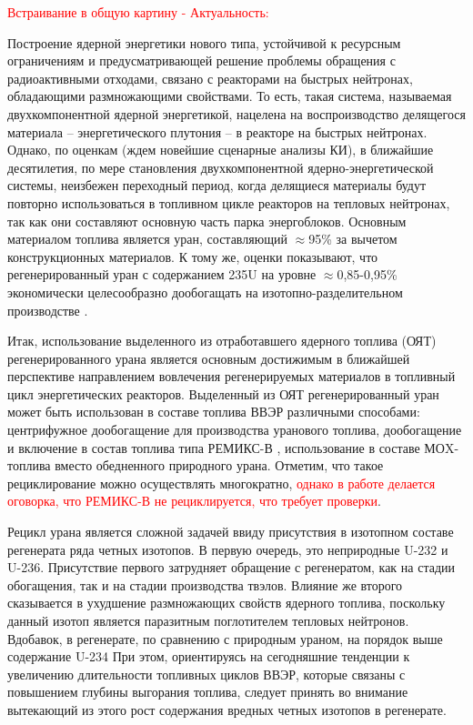 
{\actuality}

\textcolor{red}{Встраивание в общую картину - Актуальность:}

Построение ядерной энергетики нового типа, устойчивой к ресурсным ограничениям и предусматривающей решение проблемы обращения с радиоактивными отходами, связано с реакторами на быстрых нейтронах, обладающими размножающими свойствами. То есть, такая система, называемая двухкомпонентной ядерной энергетикой, нацелена на воспроизводство делящегося материала -- энергетического  плутония -- в реакторе на быстрых нейтронах. Однако, по оценкам (ждем новейшие сценарные анализы КИ), в ближайшие десятилетия, по мере становления двухкомпонентной ядерно-энергетической системы, неизбежен переходный период, когда делящиеся материалы будут повторно использоваться в топливном цикле реакторов на тепловых нейтронах, так как они составляют основную часть парка энергоблоков. Основным материалом топлива является уран, составляющий $\approx$95\% за вычетом конструкционных материалов. К тому же, оценки показывают, что регенерированный уран с содержанием 235U на уровне $\approx$0,85-0,95\% экономически целесообразно дообогащать на изотопно-разделительном производстве \cite{NikipelovNikipelovSudby}.

Итак, использование выделенного из отработавшего ядерного топлива (ОЯТ) регенерированного урана является основным достижимым в ближайшей перспективе направлением вовлечения регенерируемых материалов в топливный цикл энергетических реакторов. Выделенный из ОЯТ регенерированный уран может быть использован в составе топлива ВВЭР различными способами: центрифужное дообогащение для производства уранового топлива, дообогащение и включение в состав топлива типа РЕМИКС-В \cite{zilbermanVozmozhnostIspolzovaniyaTopliva2012}, использование в составе МОX-топлива вместо обедненного природного урана. Отметим, что такое рециклирование можно осуществлять многократно, \textcolor{red}{однако в работе \cite{postovarovaRadiacionnyeHarakteristikiRemikstopliva} делается оговорка, что РЕМИКС-В не рециклируется, что требует проверки}.

Рецикл урана является сложной задачей ввиду присутствия в изотопном составе регенерата ряда четных изотопов. В первую очередь, это неприродные U-232 и U-236. Присутствие первого затрудняет обращение с регенератом, как на стадии обогащения, так и на стадии производства твэлов. Влияние же второго сказывается в ухудшение размножающих свойств ядерного топлива, поскольку данный изотоп является паразитным поглотителем тепловых нейтронов. Вдобавок, в регенерате, по сравнению с природным ураном, на порядок выше содержание U-234 При этом, ориентируясь на сегодняшние тенденции к увеличению длительности топливных циклов ВВЭР, которые связаны с повышением глубины выгорания топлива, следует принять во внимание вытекающий из этого рост содержания вредных четных изотопов в регенерате.

